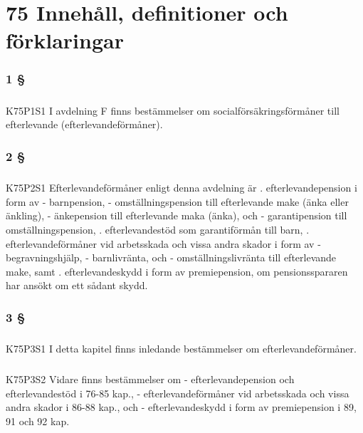 \documentclass[a4paper,notitlepage,openany,10pt]{book}
\begin{document}
\chapter*{75 Innehåll, definitioner och förklaringar}
\subsection*{1 §}
\paragraph*{}
{\tiny K75P1S1}
I avdelning F finns bestämmelser om socialförsäkringsförmåner till efterlevande (efterlevandeförmåner).
\subsection*{2 §}
\paragraph*{}
{\tiny K75P2S1}
Efterlevandeförmåner enligt denna avdelning är
. efterlevandepension i form av
\newline - barnpension,
\newline - omställningspension till efterlevande make (änka eller änkling),
\newline - änkepension till efterlevande maka (änka), och
\newline - garantipension till omställningspension,
. efterlevandestöd som garantiförmån till barn,
. efterlevandeförmåner vid arbetsskada och vissa andra skador i form av
\newline - begravningshjälp,
\newline - barnlivränta, och
\newline - omställningslivränta till efterlevande make, samt
. efterlevandeskydd i form av premiepension, om pensionsspararen har ansökt om ett sådant skydd.
\subsection*{3 §}
\paragraph*{}
{\tiny K75P3S1}
I detta kapitel finns inledande bestämmelser om efterlevandeförmåner.
\paragraph*{}
{\tiny K75P3S2}
Vidare finns bestämmelser om
\newline - efterlevandepension och efterlevandestöd i 76-85 kap.,
\newline - efterlevandeförmåner vid arbetsskada och vissa andra skador i 86-88 kap., och
\newline - efterlevandeskydd i form av premiepension i 89, 91 och 92 kap.
\end{document}
